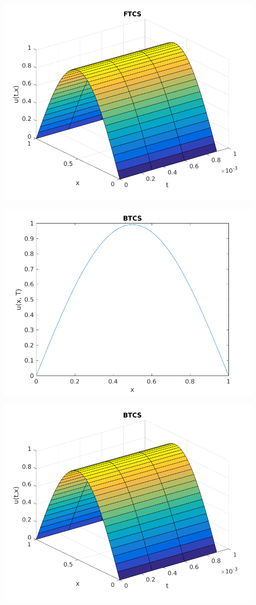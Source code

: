 \documentclass{article}
\begin{document}
\includegraphics{"q2_2"}
\pagebreak

\includegraphics{"q2_3"}
\pagebreak

\includegraphics{"q2_4"}
\pagebreak
\end{document}
